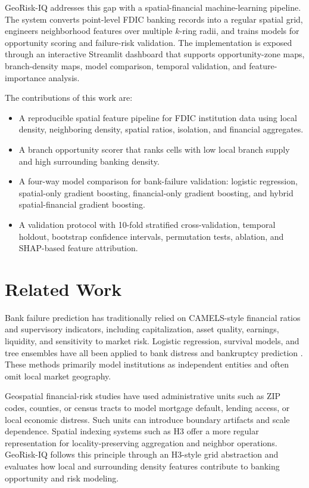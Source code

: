 \documentclass[conference]{IEEEtran}
\begin{document}
GeoRisk-IQ addresses this gap with a spatial-financial machine-learning
pipeline. The system converts point-level FDIC banking records into a
regular spatial grid, engineers neighborhood features over multiple
$k$-ring radii, and trains models for opportunity scoring and failure-risk
validation. The implementation is exposed through an interactive Streamlit
dashboard that supports opportunity-zone maps, branch-density maps, model
comparison, temporal validation, and feature-importance analysis.

The contributions of this work are:
\begin{itemize}
    \item A reproducible spatial feature pipeline for FDIC institution data
    using local density, neighboring density, spatial ratios, isolation, and
    financial aggregates.
    \item A branch opportunity scorer that ranks cells with low local branch
    supply and high surrounding banking density.
    \item A four-way model comparison for bank-failure validation:
    logistic regression, spatial-only gradient boosting, financial-only
    gradient boosting, and hybrid spatial-financial gradient boosting.
    \item A validation protocol with 10-fold stratified cross-validation,
    temporal holdout, bootstrap confidence intervals, permutation tests,
    ablation, and SHAP-based feature attribution.
\end{itemize}

\section{Related Work}
Bank failure prediction has traditionally relied on CAMELS-style financial
ratios and supervisory indicators, including capitalization, asset quality,
earnings, liquidity, and sensitivity to market risk. Logistic regression,
survival models, and tree ensembles have all been applied to bank distress
and bankruptcy prediction \cite{cole1998,betz2014,tian2015}. These methods
primarily model institutions as independent entities and often omit local
market geography.

Geospatial financial-risk studies have used administrative units such as ZIP
codes, counties, or census tracts to model mortgage default, lending access,
or local economic distress. Such units can introduce boundary artifacts and
scale dependence. Spatial indexing systems such as H3 \cite{h3} offer a
more regular representation for locality-preserving aggregation and
neighbor operations. GeoRisk-IQ follows this principle through an H3-style
grid abstraction and evaluates how local and surrounding density features
contribute to banking opportunity and risk modeling.
\end{document}
